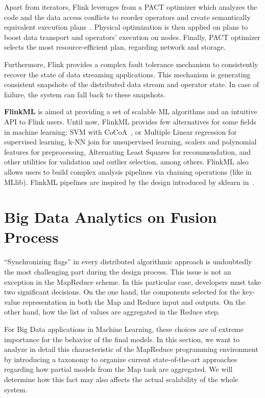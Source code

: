\documentclass[3p,review]{elsarticle}
\begin{document}
Apart from iterators, Flink leverages from a PACT optimizer which analyzes the code and the data access conflicts to reorder operators and create semantically equivalent execution plans~\cite{Alexandrov14,Hues12}. Physical optimization is then applied on plans to boost data transport and operators' execution on nodes. Finally, PACT optimizer selects the most resource-efficient plan, regarding network and storage.

Furthermore, Flink provides a complex fault tolerance mechanism to consistently recover the state of data streaming applications. This mechanism is generating consistent snapshots of the distributed data stream and operator state. In case of failure, the system can fall back to these snapshots.

\textbf{FlinkML} is aimed at providing a set of scalable ML algorithms and an intuitive API to Flink users. Until now, FlinkML provides few alternatives for some fields in machine learning: SVM with CoCoA~\cite{jaggi14}, or Multiple Linear regression for supervised learning, k-NN join for unsupervised learning, scalers and polynomial features for preprocessing, Alternating Least Squares for recommendation, and other utilities for validation and outlier selection, among others. FlinkML also allows users to build complex analysis pipelines via chaining operations (like in MLlib). FlinkML pipelines are inspired by the design introduced by sklearn in~\cite{buitin13}.

\section{Big Data Analytics on Fusion Process}\label{sec:fusion}

``Synchronizing flags'' in every distributed algorithmic approach is undoubtedly the most challenging part during the design process. This issue is not an exception in the MapReduce scheme. In this particular case, developers must take two significant decisions. On the one hand, the components selected for the key-value representation in both the Map and Reduce input and outputs. On the other hand, how the list of values are aggregated in the Reduce step. 

For Big Data applications in Machine Learning, these choices are of extreme importance for the behavior of the final models. In this section, we want to analyze in detail this characteristic of the MapReduce programming environment by introducing a taxonomy to organize current state-of-the-art approaches regarding how partial models from the Map task are aggregated. We will determine how this fact may also affects the actual scalability of the whole system. 
\end{document}
